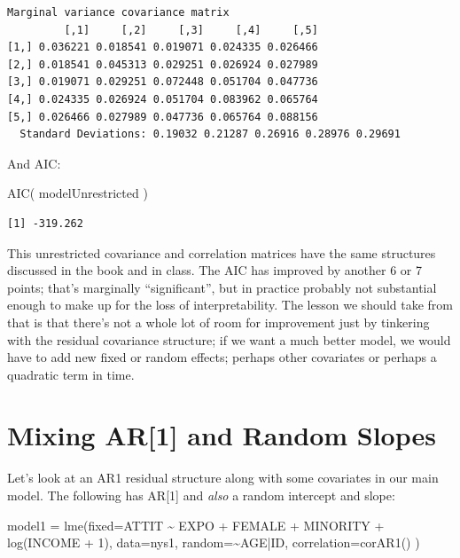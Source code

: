 \documentclass[
  letterpaper,
  DIV=11,
  numbers=noendperiod]{scrreprt}
\newenvironment{Shaded}{\begin{snugshade}}{\end{snugshade}}
\newcommand{\AttributeTok}[1]{\textcolor[rgb]{0.49,0.56,0.16}{#1}}
\newcommand{\DecValTok}[1]{\textcolor[rgb]{0.25,0.63,0.44}{#1}}
\newcommand{\FunctionTok}[1]{\textcolor[rgb]{0.02,0.16,0.49}{#1}}
\newcommand{\NormalTok}[1]{\textcolor[rgb]{0.00,0.44,0.13}{#1}}
\newcommand{\OtherTok}[1]{\textcolor[rgb]{0.00,0.44,0.13}{#1}}
\newcommand{\SpecialCharTok}[1]{\textcolor[rgb]{0.25,0.44,0.63}{#1}}
\begin{document}
\begin{verbatim}
Marginal variance covariance matrix
         [,1]     [,2]     [,3]     [,4]     [,5]
[1,] 0.036221 0.018541 0.019071 0.024335 0.026466
[2,] 0.018541 0.045313 0.029251 0.026924 0.027989
[3,] 0.019071 0.029251 0.072448 0.051704 0.047736
[4,] 0.024335 0.026924 0.051704 0.083962 0.065764
[5,] 0.026466 0.027989 0.047736 0.065764 0.088156
  Standard Deviations: 0.19032 0.21287 0.26916 0.28976 0.29691 
\end{verbatim}

And AIC:

\begin{Shaded}
\begin{Highlighting}[]
\FunctionTok{AIC}\NormalTok{( modelUnrestricted )}
\end{Highlighting}
\end{Shaded}

\begin{verbatim}
[1] -319.262
\end{verbatim}

This unrestricted covariance and correlation matrices have the same
structures discussed in the book and in class. The AIC has improved by
another 6 or 7 points; that's marginally ``significant'', but in
practice probably not substantial enough to make up for the loss of
interpretability. The lesson we should take from that is that there's
not a whole lot of room for improvement just by tinkering with the
residual covariance structure; if we want a much better model, we would
have to add new fixed or random effects; perhaps other covariates or
perhaps a quadratic term in time.

\hypertarget{mixing-ar1-and-random-slopes}{%
\section{Mixing AR{[}1{]} and Random
Slopes}\label{mixing-ar1-and-random-slopes}}

Let's look at an AR1 residual structure along with some covariates in
our main model. The following has AR{[}1{]} and \emph{also} a random
intercept and slope:

\begin{Shaded}
\begin{Highlighting}[]
\NormalTok{model1 }\OtherTok{=} \FunctionTok{lme}\NormalTok{(}\AttributeTok{fixed=}\NormalTok{ATTIT }\SpecialCharTok{\textasciitilde{}}\NormalTok{ EXPO }\SpecialCharTok{+}\NormalTok{ FEMALE }\SpecialCharTok{+}\NormalTok{ MINORITY }\SpecialCharTok{+} \FunctionTok{log}\NormalTok{(INCOME }\SpecialCharTok{+} \DecValTok{1}\NormalTok{), }
              \AttributeTok{data=}\NormalTok{nys1,}
              \AttributeTok{random=}\SpecialCharTok{\textasciitilde{}}\NormalTok{AGE}\SpecialCharTok{|}\NormalTok{ID,}
              \AttributeTok{correlation=}\FunctionTok{corAR1}\NormalTok{()  )}
\end{Highlighting}
\end{Shaded}
\end{document}
